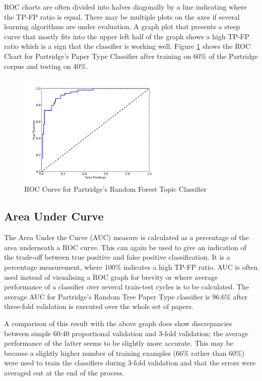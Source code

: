 ROC charts are often divided into halves diagonally by a line indicating where
the TP-FP ratio is equal. There may be multiple plots on the axes if several
learning algorithms are under evaluation. A graph plot that presents a steep
curve that mostly fits into the upper left half of the graph shows a high TP-FP
ratio which is a sign that the classifier is working well.  Figure
\ref{fig:roc_random_forest} shows the ROC Chart for Partridge's Paper Type
Classifier after training on 60\% of the Partridge corpus and testing on 40\%.

\begin{figure}[!h]
\begin{center}
\includegraphics[width=0.65\textwidth]{images/testing/ROC.png}
\caption{ ROC Curve for Partridge's Random Forest Topic Classifier}
\label{fig:roc_random_forest}
\end{center}
\end{figure}

\subsection{ Area Under Curve }

The Area Under the Curve (AUC) measure is calculated as a percentage of  the
area underneath a ROC curve. This can again be used to give an indication of
the trade-off between true positive and false positive classification. It is a
percentage measurement, where 100\% indicates a high TP-FP ratio. AUC is often
used instead of visualising a ROC graph for brevity or where average
performance of a classifier over several train-test cycles is to be calculated.
The average AUC for Partridge's Random Tree Paper Type classifier is
96.6\% after three-fold validation is executed over the whole set of papers.

A comparison of this result with the above graph does show discrepancies between
simple 60:40 proportional validation and 3-fold validation; the average
performance of the latter seems to be slightly more accurate. This may be
because a slightly higher number of training examples (66\% rather than 60\%)
were used to train the classifiers during 3-fold validation and that the errors
were averaged out at the end of the process.

